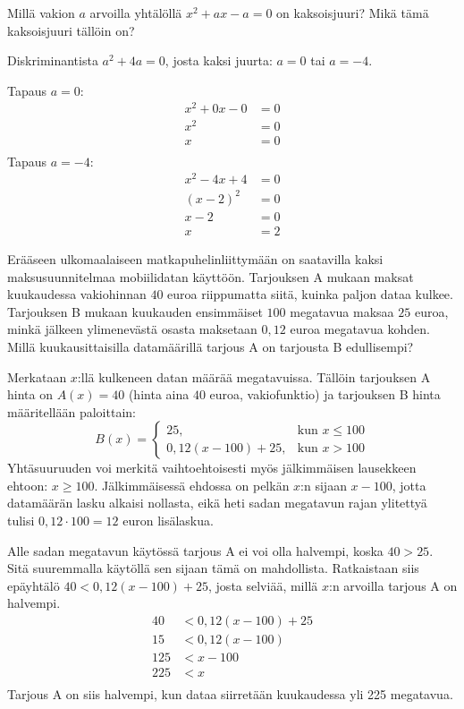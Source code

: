 \begin{tehtava}
Millä vakion $a$ arvoilla yhtälöllä $x^2+ax-a=0$ on kaksoisjuuri? Mikä tämä kaksoisjuuri tällöin on?
	\begin{vastaus}
Diskriminantista $a^2+4a=0$, josta kaksi juurta: $a=0$ tai $a=-4$.

Tapaus $a=0$:
\begin{align*}
x^2+0x-0&=0 \\
x^2&=0 \\
x&=0 \\
\end{align*}
Tapaus $a=-4$:
\begin{align*}
x^2-4x+4&=0 \\
(x-2)^2&=0 \\
x-2&=0 \\
x&=2
\end{align*}
	\end{vastaus}
\end{tehtava}

\begin{tehtava} %
Erääseen ulkomaalaiseen matkapuhelinliittymään on saatavilla kaksi maksusuunnitelmaa mobiilidatan käyttöön. Tarjouksen A mukaan maksat kuukaudessa vakiohinnan $40$ euroa riippumatta siitä, kuinka paljon dataa kulkee. Tarjouksen B mukaan kuukauden ensimmäiset $100$ megatavua maksaa $25$ euroa, minkä jälkeen ylimenevästä osasta maksetaan $0,12$ euroa megatavua kohden. Millä kuukausittaisilla datamäärillä tarjous A on tarjousta B edullisempi?
	\begin{vastaus}
	Merkataan $x$:llä kulkeneen datan määrää megatavuissa. Tällöin tarjouksen A hinta on $A(x)=40$ (hinta aina $40$ euroa, vakiofunktio) ja tarjouksen B hinta määritellään paloittain:
	$$B(x)=\begin{cases}
	25, & \mbox{kun } x\leq 100 \\
	0,12(x-100)+25, & \mbox{kun } x>100
	\end{cases}$$
Yhtäsuuruuden voi merkitä vaihtoehtoisesti myös jälkimmäisen lausekkeen ehtoon: $x\geq 100$. Jälkimmäisessä ehdossa on pelkän $x$:n sijaan $x-100$, jotta datamäärän lasku alkaisi nollasta, eikä heti sadan megatavun rajan ylitettyä tulisi $0,12\cdot 100=12$ euron lisälaskua.

Alle sadan megatavun käytössä tarjous A ei voi olla halvempi, koska $40>25$. Sitä suuremmalla käytöllä sen sijaan tämä on mahdollista. Ratkaistaan siis epäyhtälö $40<0,12(x-100)+25$, josta selviää, millä $x$:n arvoilla tarjous A on halvempi.
\begin{align*}
40&<0,12(x-100)+25 \\
15 &<0,12(x-100) \\
125&<x-100 \\
225&<x \\
\end{align*}
	Tarjous A on siis halvempi, kun dataa siirretään kuukaudessa yli 225 megatavua.
	\end{vastaus}
\end{tehtava}


